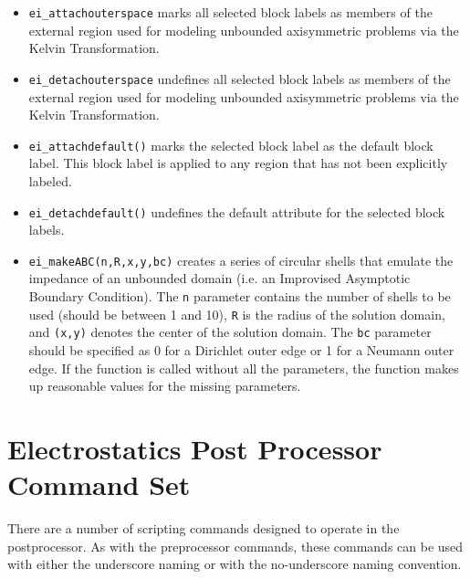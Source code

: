 \begin{itemize}
\item{\tt ei\_attachouterspace} marks all
selected block labels as members of the external region used for
modeling unbounded axisymmetric problems via the Kelvin
Transformation.

\item{\tt ei\_detachouterspace} undefines all selected block labels
as members of the external region used for modeling unbounded axisymmetric
problems via the Kelvin Transformation.

\item{\tt ei\_attachdefault()} marks the
selected block label as the default block label.  This block label
is applied to any region that has not been explicitly labeled.

\item{\tt ei\_detachdefault()} undefines the default
attribute for the selected block labels.

\item{\tt ei\_makeABC(n,R,x,y,bc)} creates a series of circular shells that emulate the
impedance of an unbounded domain (i.e. an Improvised Asymptotic Boundary
Condition).  The {\tt n} parameter contains the number of shells to be used
(should be between 1 and 10), {\tt R} is the radius of the solution domain, and
{\tt (x,y)} denotes the center of the solution domain.  The {\tt bc} parameter should
be specified as 0 for a Dirichlet outer edge or 1 for a Neumann outer edge.
If the function is called without all the parameters, the function makes up
reasonable values for the missing parameters. 

\end{itemize}

\section{Electrostatics Post Processor Command Set}

There are a number of scripting commands designed to operate in
the postprocessor. As with the preprocessor commands, these
commands can be used with either the underscore naming or with the
no-underscore naming convention.

